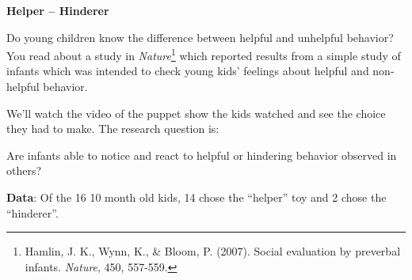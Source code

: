
\def\theTopic{Helper--Hinderer }
\def\dayNum{4}


\begin{center}
\vspace*{-.2in}
{\bf {\large Helper -- Hinderer}}\\
\end{center}

Do young children know the difference between helpful and unhelpful
behavior?  You read about a study in   {\it Nature}\footnote{ Hamlin, J. K.,
  Wynn, K., \& Bloom, P. (2007). Social evaluation by preverbal
  infants. {\it Nature}, 450, 557-559. } which
reported results from a simple study of infants which was intended to
check young kids' feelings about helpful and non-helpful behavior.  

We'll watch the video of the puppet show the kids watched and see the
choice they had to make.  The research question is:
\begin{center}
  {\sf Are infants able to notice and react to helpful or hindering
    behavior observed in others?} 
\end{center}

{\bf Data}:  Of the 16 10 month old kids, 14 chose the ``helper'' toy
and 2 chose the ``hinderer''.

